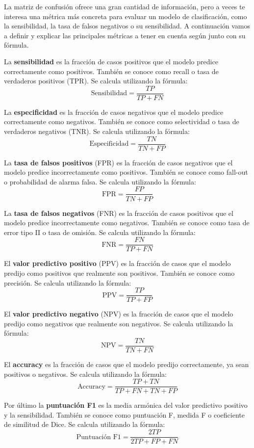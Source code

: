 La matriz de confusión ofrece una gran cantidad de información, pero a veces te interesa una métrica más concreta para evaluar un modelo de clasificación, como la sensibilidad, la tasa de falsos negativos o su sensibilidad. A continuación vamos a definir y explicar las principales métricas a tener en cuenta según \citep{erickson2021magician} junto con su fórmula. 

La \textbf{sensibilidad} es la fracción de casos positivos que el modelo predice correctamente como positivos. También se conoce como recall o tasa de verdaderos positivos (TPR). Se calcula utilizando la fórmula:
\[
\text{Sensibilidad} = \frac{TP}{TP + FN}
\]

La \textbf{especificidad} es la fracción de casos negativos que el modelo predice correctamente como negativos. También se conoce como selectividad o tasa de verdaderos negativos (TNR). Se calcula utilizando la fórmula:
\[
\text{Especificidad} = \frac{TN}{TN + FP}
\]

La \textbf{tasa de falsos positivos} (FPR) es la fracción de casos negativos que el modelo predice incorrectamente como positivos. También se conoce como fall-out o probabilidad de alarma falsa. Se calcula utilizando la fórmula:
\[
\text{FPR} = \frac{FP}{TN + FP}
\]

La \textbf{tasa de falsos negativos} (FNR) es la fracción de casos positivos que el modelo predice incorrectamente como negativos. También se conoce como tasa de error tipo II o tasa de omisión. Se calcula utilizando la fórmula:
\[
\text{FNR} = \frac{FN}{TP + FN}
\]

El \textbf{valor predictivo positivo} (PPV) es la fracción de casos que el modelo predijo como positivos que realmente son positivos. También se conoce como precisión. Se calcula utilizando la fórmula:
\[
\text{PPV} = \frac{TP}{TP + FP}
\]

El \textbf{valor predictivo negativo} (NPV) es la fracción de casos que el modelo predijo como negativos que realmente son negativos. Se calcula utilizando la fórmula:
\[
\text{NPV} = \frac{TN}{TN + FN}
\]

El \textbf{accuracy} es la fracción de casos que el modelo predijo correctamente, ya sean positivos o negativos. Se calcula utilizando la fórmula:
\[
\text{Accuracy} = \frac{TP + TN}{TP + FN + TN + FP}
\]

Por último la \textbf{puntuación F1} es la media armónica del valor predictivo positivo y la sensibilidad. También se conoce como puntuación F, medida F o coeficiente de similitud de Dice. Se calcula utilizando la fórmula:
\[
\text{Puntuación F1} = \frac{2TP}{2TP + FP + FN}
\]



